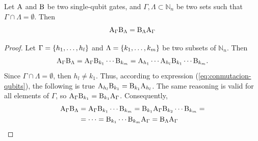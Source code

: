 \documentclass[sigconf,natbib=false]{acmart}
\begin{document}
	\begin{proposition}
		Let $\text{A}$ and $\text{B}$ be two single-qubit gates, and $\Gamma, \Lambda \subset \mathbb{N}_n$ be two sets such that $\Gamma\cap\Lambda=\emptyset$.
		Then
		\begin{equation}
			\label{eq:conmutacion-sets}
			\text{A}_\Gamma\text{B}_{\Lambda} = \text{B}_{\Lambda}\text{A}_{\Gamma}
		\end{equation}
	\end{proposition}
	\begin{proof}
		Let $\Gamma=\{h_1,\dots,h_l\}$ and $\Lambda=\{k_1,\dots,k_m\}$ be two subsets of $\mathbb{N}_n$. Then
		\begin{align*}
			\text{A}_{\Gamma}\text{B}_{\Lambda}=\text{A}_{\Gamma}\text{B}_{k_1}\cdots\text{B}_{k_m}=\text{A}_{h_1}\cdots\text{A}_{h_l}\text{B}_{k_1}\cdots\text{B}_{k_m}.
		\end{align*}
		Since $\Gamma\cap\Lambda=\emptyset$, then $h_l\neq k_1$. Thus, according to expression (\ref{eq:conmutacion-qubits}), the following is true $\text{A}_{h_l}\text{B}_{k_1}=\text{B}_{k_1}\text{A}_{h_l}$.
		The same reasoning is valid for all elements of $\Gamma$, so $\text{A}_{\Gamma}\text{B}_{k_1}=\text{B}_{k_1}\text{A}_{\Gamma}$. Consequently,
		\begin{align*}
			\text{A}_{\Gamma}\text{B}_{\Lambda}&=\text{A}_{\Gamma}\text{B}_{k_1}\cdots\text{B}_{k_m}=\text{B}_{k_1}\text{A}_{\Gamma}\text{B}_{k_2}\cdots\text{B}_{k_m}=\\
			&=\dots = \text{B}_{k_1}\cdots\text{B}_{k_m}\text{A}_{\Gamma}=\text{B}_{\Lambda}\text{A}_{\Gamma}
		\end{align*}
	\end{proof}
\end{document}
